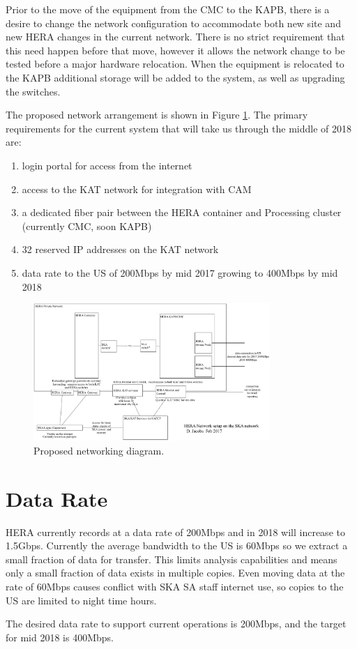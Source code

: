 \documentclass{article}
\begin{document}
Prior to the move of the equipment from the CMC to the KAPB, there is a desire to change the network configuration to accommodate both new site and new HERA changes in the current network.  There is no strict requirement that this need happen before that move, however it allows the network change to be tested before a major hardware relocation.  When the equipment is relocated to the KAPB additional storage will be added to the system, as well as upgrading the switches.

The proposed network arrangement is shown in Figure \ref{fig:net_org}.  The primary requirements for the current system that will take us through the middle of 2018 are:
\begin{enumerate}
\item login portal for access from the internet
\item access to the KAT network for integration with CAM
\item a dedicated fiber pair between the HERA container and Processing cluster (currently CMC, soon KAPB)
\item 32 reserved IP addresses on the KAT network
\item data rate to the US of 200Mbps by mid 2017 growing to 400Mbps by mid 2018
\end{enumerate}

\begin{figure}[H]
\includegraphics[width=0.8\textwidth]{HERA_2017_network_organization.png}
\centering
\caption{Proposed networking diagram.}
\label{fig:net_org}
\end{figure}

\section{Data Rate}
HERA currently records at a data rate of 200Mbps and in 2018 will increase to 1.5Gbps. Currently the average bandwidth to the US is 60Mbps so we extract a small fraction of data for transfer. This limits analysis capabilities and means only a small fraction of data exists in multiple copies.  Even moving data at the rate of 60Mbps causes conflict with SKA SA staff internet use, so copies to the US are limited to night time hours.  

The desired data rate to support current operations is 200Mbps, and the target for mid 2018 is 400Mbps.
\end{document}
